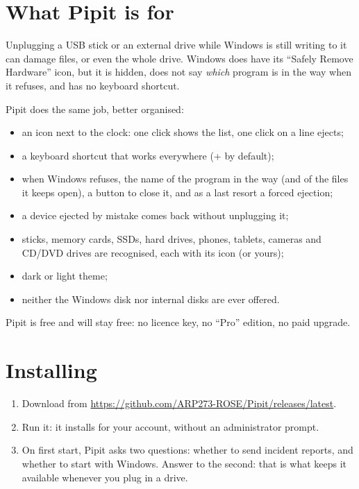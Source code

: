 \tableofcontents
\newpage

\section{What Pipit is for}

Unplugging a USB stick or an external drive while Windows is still writing to it can
damage files, or even the whole drive. Windows does have its “Safely Remove Hardware”
icon, but it is hidden, does not say \emph{which} program is in the way when it
refuses, and has no keyboard shortcut.

Pipit does the same job, better organised:

\begin{itemize}
\item an icon next to the clock: one click shows the list, one click on a line ejects;
\item a keyboard shortcut that works everywhere (+ by default);
\item when Windows refuses, the name of the program in the way (and of the files it keeps
  open), a button to close it, and as a last resort a forced ejection;
\item a device ejected by mistake comes back without unplugging it;
\item sticks, memory cards, SSDs, hard drives, phones, tablets, cameras and CD/DVD drives
  are recognised, each with its icon (or yours);
\item dark or light theme;
\item neither the Windows disk nor internal disks are ever offered.
\end{itemize}

Pipit is free and will stay free: no licence key, no “Pro” edition, no paid upgrade.

\section{Installing}

\begin{enumerate}
\item Download  from
  \url{https://github.com/ARP273-ROSE/Pipit/releases/latest}.
\item Run it: it installs for your account, without an administrator prompt.
\item On first start, Pipit asks two questions: whether to send incident reports, and
  whether to start with Windows. Answer  to the second: that is what keeps it
  available whenever you plug in a drive.
\end{enumerate}

